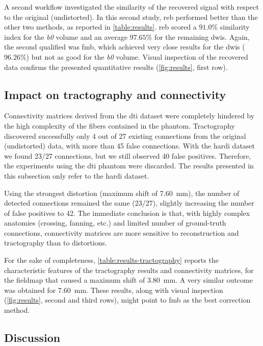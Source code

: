 A second workflow investigated the similarity of the recovered
signal with respect to the original (undistorted).
In this second study, \gls*{reb} performed
better than the other two methods, as reported
in \autoref{table:results}. \gls*{reb} scored a $91.0\%$
similarity index for the \textit{b0} volume and an average $97.65\%$
for the remaining \glspl*{dwi}. Again, the second
qualified was \gls*{fmb}, which achieved very close results
for the \glspl*{dwi} ($96.26\%$) but not as good for the \textit{b0}
volume. Visual inspection of the recovered data confirms the 
presented quantitative results (\autoref{fig:results}, first row).


\subsection{Impact on tractography and connectivity}

Connectivity matrices derived from the \gls*{dti} dataset
were completely hindered by the high complexity of the 
fibers contained
in the phantom. Tractography discovered successfully only 4 out 
of 27 existing connections from the original (undistorted) data,
with more than 45 false connections.
With the \gls*{hardi} dataset we found 23/27 connections,
but we still observed 40 false positives. Therefore, the 
experiments using the \gls*{dti} phantom were discarded. The
results presented in this subsection only refer to the 
\gls*{hardi} dataset.

Using the strongest distortion (maximum shift of 7.60~mm),
the number of detected connections
remained the same (23/27), slightly increasing the number of
false positives to 42. The immediate conclusion is that, with highly
complex anatomies (crossing, fanning, etc.) and limited number of
ground-truth connections, connectivity matrices are more sensitive 
to reconstruction and tractography than to distortions.

For the sake of completeness, \autoref{table:results-tractography}
reports the characteristic features of the tractography results
and connectivity matrices, for the fieldmap that caused a maximum
shift of 3.80~mm. A very similar outcome was obtained for
7.60~mm. These results, along with visual inspection
(\autoref{fig:results}, second and third rows), might point
to \gls*{fmb} as the best correction method.


\subsection{Discussion}

